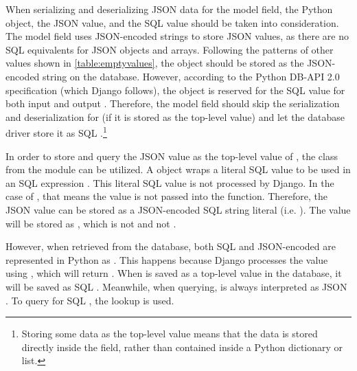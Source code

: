 When serializing and deserializing JSON data for the model field, the Python
 object, the JSON  value, and the SQL  value
should be taken into consideration. The model field uses JSON-encoded strings
to store JSON values, as there are no SQL equivalents for JSON objects and
arrays. Following the patterns of other values shown in
\autoref{table:emptyvalues}, the  object should be stored as the
JSON-encoded  string on the database. However, according to the
Python DB-API 2.0 specification (which Django follows), the  object
is reserved for the SQL  value for both input and output
\cite{db-api2}. Therefore, the model field should skip the serialization and
deserialization for  (if it is stored as the top-level value) and let
the database driver store it as SQL .\footnote{Storing some data as
the top-level value means that the data is stored directly inside the field,
rather than contained inside a Python dictionary or list.}

In order to store and query the JSON  value as the top-level value
of , the  class from the 
module can be utilized. A  object wraps a literal SQL value to be
used in an SQL expression \cite{django:value}. This literal SQL value is not
processed by Django. In the case of , that means the value is
not passed into the  function. Therefore, the JSON
 value can be stored as a JSON-encoded SQL string literal (i.e.
). The value will be stored as , which is
not  and not .

However, when retrieved from the database, both SQL  and
JSON-encoded  are represented in Python as . This
happens because Django processes the  value using
, which will return . When  is saved
as a top-level value in the database, it will be saved as SQL .
Meanwhile, when querying,  is always interpreted as JSON
. To query for SQL , the  lookup is used.

\noindent
\begin{minipage}{\linewidth}

\end{minipage}

